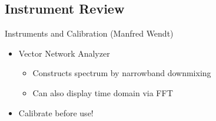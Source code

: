 \documentclass{beamer}
\begin{document}
\subsection{Instrument Review}
\begin{frame}[t,fragile]{Instruments and Calibration (Manfred Wendt)}
\begin{figure}
  \centering\setcounter{subfigure}{0}
  \;
\end{figure}
\begin{itemize}
\item Vector Network Analyzer
\begin{itemize}
\item Constructs spectrum by narrowband downmixing
\item Can also display time domain via FFT
\end{itemize}
\item Calibrate before use!
\end{itemize}
\end{frame}
\end{document}
